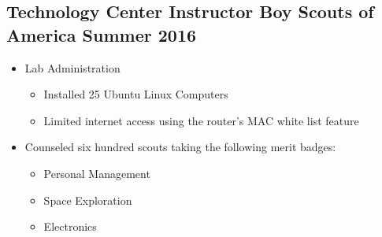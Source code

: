 \subsection{Technology Center Instructor \hspace {25pt} Boy Scouts of America \hfill Summer 2016}
\begin{itemize}
	\item Lab Administration
		\begin{itemize}
			\item Installed 25 Ubuntu Linux Computers
			\item Limited internet access using the router's MAC white list feature
		\end{itemize}
	\item Counseled six hundred scouts taking the following merit badges:
	\begin{itemize}
		\item Personal Management
		\item Space Exploration
		\item Electronics
	\end{itemize}
\end{itemize}

